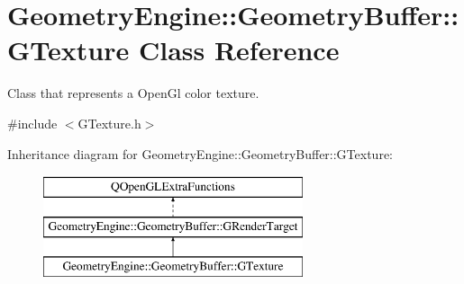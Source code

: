 \hypertarget{class_geometry_engine_1_1_geometry_buffer_1_1_g_texture}{}\section{Geometry\+Engine\+::Geometry\+Buffer\+::G\+Texture Class Reference}
\label{class_geometry_engine_1_1_geometry_buffer_1_1_g_texture}


Class that represents a Open\+Gl color texture.  




{\ttfamily \#include $<$G\+Texture.\+h$>$}

Inheritance diagram for Geometry\+Engine\+::Geometry\+Buffer\+::G\+Texture\+:\begin{figure}[H]
\begin{center}
\leavevmode
\includegraphics[height=3.000000cm]{class_geometry_engine_1_1_geometry_buffer_1_1_g_texture}
\end{center}
\end{figure}
